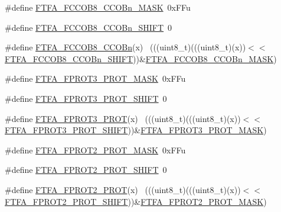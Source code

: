 \begin{DoxyCompactItemize}
\item 
\#define \hyperlink{group___f_t_f_a___register___masks_ga4c40268e4d4ae3bc87a782cbbfc9ec99}{F\+T\+F\+A\+\_\+\+F\+C\+C\+O\+B8\+\_\+\+C\+C\+O\+Bn\+\_\+\+M\+A\+SK}~0x\+F\+Fu
\item 
\#define \hyperlink{group___f_t_f_a___register___masks_ga9603935c5e6f2c1d51b6b4e952e1428a}{F\+T\+F\+A\+\_\+\+F\+C\+C\+O\+B8\+\_\+\+C\+C\+O\+Bn\+\_\+\+S\+H\+I\+FT}~0
\item 
\#define \hyperlink{group___f_t_f_a___register___masks_ga017610265175ee31c063f1f4cde09f63}{F\+T\+F\+A\+\_\+\+F\+C\+C\+O\+B8\+\_\+\+C\+C\+O\+Bn}(x)                                      ~(((uint8\+\_\+t)(((uint8\+\_\+t)(x))$<$$<$\hyperlink{group___f_t_f_a___register___masks_ga9603935c5e6f2c1d51b6b4e952e1428a}{F\+T\+F\+A\+\_\+\+F\+C\+C\+O\+B8\+\_\+\+C\+C\+O\+Bn\+\_\+\+S\+H\+I\+FT}))\&\hyperlink{group___f_t_f_a___register___masks_ga4c40268e4d4ae3bc87a782cbbfc9ec99}{F\+T\+F\+A\+\_\+\+F\+C\+C\+O\+B8\+\_\+\+C\+C\+O\+Bn\+\_\+\+M\+A\+SK})
\item 
\#define \hyperlink{group___f_t_f_a___register___masks_gaa5d3fe6e00716f1d147e22799ba5b7ae}{F\+T\+F\+A\+\_\+\+F\+P\+R\+O\+T3\+\_\+\+P\+R\+O\+T\+\_\+\+M\+A\+SK}~0x\+F\+Fu
\item 
\#define \hyperlink{group___f_t_f_a___register___masks_ga35d09e54593dc5d05e0946e9ca3ae42b}{F\+T\+F\+A\+\_\+\+F\+P\+R\+O\+T3\+\_\+\+P\+R\+O\+T\+\_\+\+S\+H\+I\+FT}~0
\item 
\#define \hyperlink{group___f_t_f_a___register___masks_ga0cc70ceab9f611ea3623e28d8526a9f4}{F\+T\+F\+A\+\_\+\+F\+P\+R\+O\+T3\+\_\+\+P\+R\+OT}(x)                                        ~(((uint8\+\_\+t)(((uint8\+\_\+t)(x))$<$$<$\hyperlink{group___f_t_f_a___register___masks_ga35d09e54593dc5d05e0946e9ca3ae42b}{F\+T\+F\+A\+\_\+\+F\+P\+R\+O\+T3\+\_\+\+P\+R\+O\+T\+\_\+\+S\+H\+I\+FT}))\&\hyperlink{group___f_t_f_a___register___masks_gaa5d3fe6e00716f1d147e22799ba5b7ae}{F\+T\+F\+A\+\_\+\+F\+P\+R\+O\+T3\+\_\+\+P\+R\+O\+T\+\_\+\+M\+A\+SK})
\item 
\#define \hyperlink{group___f_t_f_a___register___masks_ga17b0f04e6c61b3683a99ef21674d8329}{F\+T\+F\+A\+\_\+\+F\+P\+R\+O\+T2\+\_\+\+P\+R\+O\+T\+\_\+\+M\+A\+SK}~0x\+F\+Fu
\item 
\#define \hyperlink{group___f_t_f_a___register___masks_ga7c2381deecb19163451591155ba5a05e}{F\+T\+F\+A\+\_\+\+F\+P\+R\+O\+T2\+\_\+\+P\+R\+O\+T\+\_\+\+S\+H\+I\+FT}~0
\item 
\#define \hyperlink{group___f_t_f_a___register___masks_ga18c11264564d827c13ac8c2587757f3c}{F\+T\+F\+A\+\_\+\+F\+P\+R\+O\+T2\+\_\+\+P\+R\+OT}(x)                                        ~(((uint8\+\_\+t)(((uint8\+\_\+t)(x))$<$$<$\hyperlink{group___f_t_f_a___register___masks_ga7c2381deecb19163451591155ba5a05e}{F\+T\+F\+A\+\_\+\+F\+P\+R\+O\+T2\+\_\+\+P\+R\+O\+T\+\_\+\+S\+H\+I\+FT}))\&\hyperlink{group___f_t_f_a___register___masks_ga17b0f04e6c61b3683a99ef21674d8329}{F\+T\+F\+A\+\_\+\+F\+P\+R\+O\+T2\+\_\+\+P\+R\+O\+T\+\_\+\+M\+A\+SK})
$$
\end{DoxyCompactItemize}
